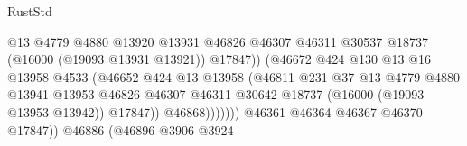 \begin{lexlean}{RustStd}
\begin{coremodule}
                                                  @13
                                                  @4779
                                                  @4880
                                                  @13920
                                                  @13931
                                                  @46826
                                                  @46307
                                                  @46311
                                                  @30537
                                                  @18737
                                                  (@16000 (@19093 @13931 @13921))
                                                  @17847))
                                              (@46672
                                                @424
                                                @130
                                                @13
                                                @16
                                                @13958
                                                @4533
                                                (@46652
                                                  @424
                                                  @13
                                                  @13958
                                                  (@46811
                                                    @231
                                                    @37
                                                    @13
                                                    @4779
                                                    @4880
                                                    @13941
                                                    @13953
                                                    @46826
                                                    @46307
                                                    @46311
                                                    @30642
                                                    @18737
                                                    (@16000 (@19093 @13953 @13942))
                                                    @17847))
                                                @46868)))))))
                                  @46361
                                  @46364
                                  @46367
                                  @46370
                                  @17847))
                              @46886
                              (@46896
                                @3906
                                @3924

\end{coremodule}
\end{lexlean}
